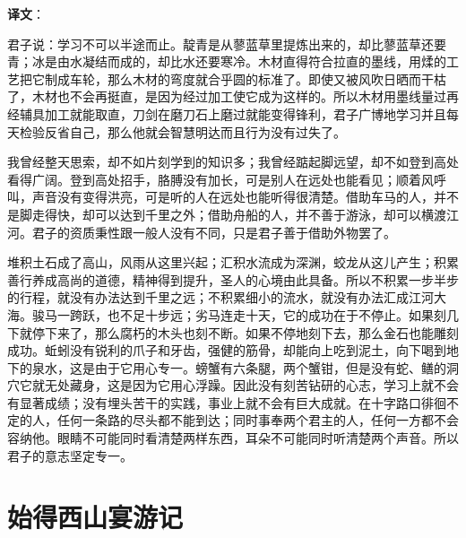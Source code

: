 \documentclass[12pt,UTF-8,openany]{ctexbook}
\begin{document}
\newpage

\textbf{译文}：

\vspace{1em}

\begin{normalsize}
    
    君子说：学习不可以半途而止。靛青是从蓼蓝草里提炼出来的，却比蓼蓝草还要青；冰是由水凝结而成的，却比水还要寒冷。木材直得符合拉直的墨线，用煣的工艺把它制成车轮，那么木材的弯度就合乎圆的标准了。即使又被风吹日晒而干枯了，木材也不会再挺直，是因为经过加工使它成为这样的。所以木材用墨线量过再经辅具加工就能取直，刀剑在磨刀石上磨过就能变得锋利，君子广博地学习并且每天检验反省自己，那么他就会智慧明达而且行为没有过失了。
    
    我曾经整天思索，却不如片刻学到的知识多；我曾经踮起脚远望，却不如登到高处看得广阔。登到高处招手，胳膊没有加长，可是别人在远处也能看见；顺着风呼叫，声音没有变得洪亮，可是听的人在远处也能听得很清楚。借助车马的人，并不是脚走得快，却可以达到千里之外；借助舟船的人，并不善于游泳，却可以横渡江河。君子的资质秉性跟一般人没有不同，只是君子善于借助外物罢了。
    
    堆积土石成了高山，风雨从这里兴起；汇积水流成为深渊，蛟龙从这儿产生；积累善行养成高尚的道德，精神得到提升，圣人的心境由此具备。所以不积累一步半步的行程，就没有办法达到千里之远；不积累细小的流水，就没有办法汇成江河大海。骏马一跨跃，也不足十步远；劣马连走十天，它的成功在于不停止。如果刻几下就停下来了，那么腐朽的木头也刻不断。如果不停地刻下去，那么金石也能雕刻成功。蚯蚓没有锐利的爪子和牙齿，强健的筋骨，却能向上吃到泥土，向下喝到地下的泉水，这是由于它用心专一。螃蟹有六条腿，两个蟹钳，但是没有蛇、鳝的洞穴它就无处藏身，这是因为它用心浮躁。因此没有刻苦钻研的心志，学习上就不会有显著成绩；没有埋头苦干的实践，事业上就不会有巨大成就。在十字路口徘徊不定的人，任何一条路的尽头都不能到达；同时事奉两个君主的人，任何一方都不会容纳他。眼睛不可能同时看清楚两样东西，耳朵不可能同时听清楚两个声音。所以君子的意志坚定专一。
    
\end{normalsize}



\chapter{始得西山宴游记}
\end{document}
